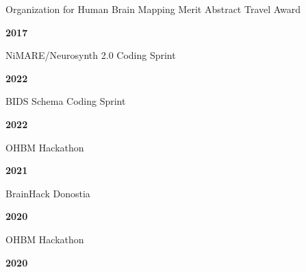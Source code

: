 \documentclass[10pt]{article}
\newcommand{\sectionstyle}{\LARGE \fontfamily{lmr}\selectfont}
\begin{document}
\begin{minipage}[t]{.85\linewidth}
	\flushleft
	\noindent
	Organization for Human Brain Mapping Merit Abstract Travel Award
\end{minipage}
\hfill
\begin{minipage}[t]{.15\linewidth}
	\flushright
	\noindent
	\textsc{\textbf{2017}}
\end{minipage}

\newpage

\begin{center}\sectionstyle{HACKATHONS}\end{center}

\begin{minipage}[t]{.85\linewidth}
	\flushleft
	\noindent
	NiMARE/Neurosynth 2.0 Coding Sprint
	\end{minipage}
	\hfill
	\begin{minipage}[t]{.15\linewidth}
	\flushright
	\noindent
	\textsc{\textbf{2022}}
\end{minipage}

\begin{minipage}[t]{.85\linewidth}
	\flushleft
	\noindent
	BIDS Schema Coding Sprint
	\end{minipage}
	\hfill
	\begin{minipage}[t]{.15\linewidth}
	\flushright
	\noindent
	\textsc{\textbf{2022}}
\end{minipage}

\begin{minipage}[t]{.85\linewidth}
	\flushleft
	\noindent
	OHBM Hackathon
	\end{minipage}
	\hfill
	\begin{minipage}[t]{.15\linewidth}
	\flushright
	\noindent
	\textsc{\textbf{2021}}
\end{minipage}

\begin{minipage}[t]{.85\linewidth}
	\flushleft
	\noindent
	BrainHack Donostia
	\end{minipage}
	\hfill
	\begin{minipage}[t]{.15\linewidth}
	\flushright
	\noindent
	\textsc{\textbf{2020}}
\end{minipage}

\begin{minipage}[t]{.85\linewidth}
	\flushleft
	\noindent
	OHBM Hackathon
	\end{minipage}
	\hfill
	\begin{minipage}[t]{.15\linewidth}
	\flushright
	\noindent
	\textsc{\textbf{2020}}
\end{minipage}
\end{document}
